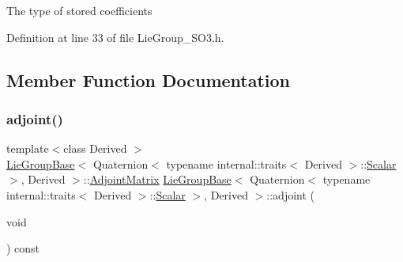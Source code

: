 The type of stored coefficients 

Definition at line 33 of file Lie\+Group\+\_\+\+S\+O3.\+h.



\subsection{Member Function Documentation}
\hypertarget{class_lie_group_base_3_01_quaternion_3_01typename_01internal_1_1traits_3_01_derived_01_4_1_1_scalar_01_4_00_01_derived_01_4_a75f0e03d56ddc8d87cf14b37bb3662d2}{}\label{class_lie_group_base_3_01_quaternion_3_01typename_01internal_1_1traits_3_01_derived_01_4_1_1_scalar_01_4_00_01_derived_01_4_a75f0e03d56ddc8d87cf14b37bb3662d2} 
\subsubsection{\texorpdfstring{adjoint()}{adjoint()}\hspace{0.1cm}{\footnotesize\ttfamily [1/2]}}
{\footnotesize\ttfamily template$<$class Derived $>$ \\
\hyperlink{class_lie_group_base}{Lie\+Group\+Base}$<$ Quaternion$<$ typename internal\+::traits$<$ Derived $>$\+::\hyperlink{class_lie_group_base_3_01_quaternion_3_01typename_01internal_1_1traits_3_01_derived_01_4_1_1_scalar_01_4_00_01_derived_01_4_afadeceb3b98e52deecc572e71efb82a8}{Scalar} $>$, Derived $>$\+::\hyperlink{class_lie_group_base_3_01_quaternion_3_01typename_01internal_1_1traits_3_01_derived_01_4_1_1_scalar_01_4_00_01_derived_01_4_a78de97b1de2faa5ee198be16e6b61931}{Adjoint\+Matrix} \hyperlink{class_lie_group_base}{Lie\+Group\+Base}$<$ Quaternion$<$ typename internal\+::traits$<$ Derived $>$\+::\hyperlink{class_lie_group_base_3_01_quaternion_3_01typename_01internal_1_1traits_3_01_derived_01_4_1_1_scalar_01_4_00_01_derived_01_4_afadeceb3b98e52deecc572e71efb82a8}{Scalar} $>$, Derived $>$\+::adjoint (\begin{DoxyParamCaption}\item[{void}]{ }\end{DoxyParamCaption}) const\hspace{0.3cm}{\ttfamily [inline]}}

